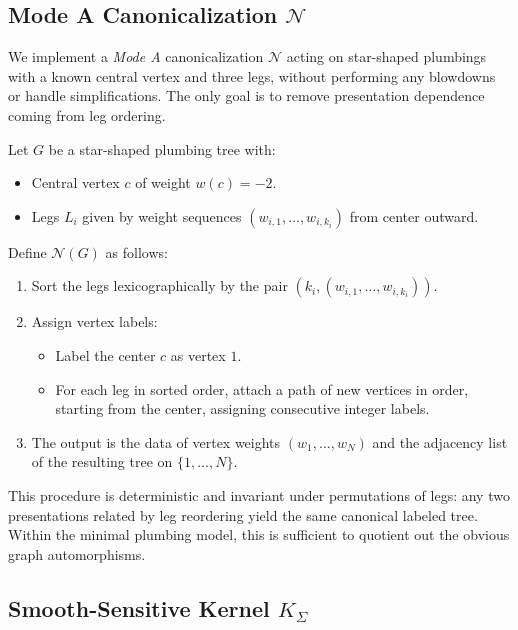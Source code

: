 \documentclass[11pt]{article}
\begin{document}
\subsection{Mode A Canonicalization \texorpdfstring{$\mathcal N$}{N}}

We implement a \emph{Mode A} canonicalization $\mathcal N$ acting on star-shaped plumbings with a known central vertex and three legs, without performing any blowdowns or handle simplifications. The only goal is to remove presentation dependence coming from leg ordering.

\begin{definition}
Let $G$ be a star-shaped plumbing tree with:
\begin{itemize}[leftmargin=1.5em]
  \item Central vertex $c$ of weight $w(c)=-2$.
  \item Legs $L_i$ given by weight sequences $(w_{i,1},\dots,w_{i,k_i})$ from center outward.
\end{itemize}
Define $\mathcal N(G)$ as follows:
\begin{enumerate}[label=(\alph*),leftmargin=1.5em]
  \item Sort the legs lexicographically by the pair $(k_i,(w_{i,1},\dots,w_{i,k_i}))$.
  \item Assign vertex labels:
  \begin{itemize}[leftmargin=1em]
    \item Label the center $c$ as vertex $1$.
    \item For each leg in sorted order, attach a path of new vertices in order, starting from the center, assigning consecutive integer labels.
  \end{itemize}
  \item The output is the data of vertex weights $(w_1,\dots,w_N)$ and the adjacency list of the resulting tree on $\{1,\dots,N\}$.
\end{enumerate}
\end{definition}

This procedure is deterministic and invariant under permutations of legs: any two presentations related by leg reordering yield the same canonical labeled tree.\cite{exotic-mult} Within the minimal plumbing model, this is sufficient to quotient out the obvious graph automorphisms.

\subsection{Smooth-Sensitive Kernel \texorpdfstring{$K_\Sigma$}{KΣ}}
\end{document}
